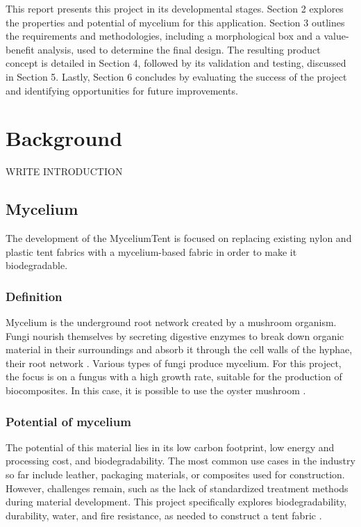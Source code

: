 \documentclass{article}
\begin{document}
This report presents this project in its developmental stages. Section 2 explores the
properties and potential of mycelium for this application. Section 3 outlines the
requirements and methodologies, including a morphological box and a value-benefit
analysis, used to determine the final design. The resulting product concept is detailed in
Section 4, followed by its validation and testing, discussed in Section 5. Lastly,
Section 6 concludes by evaluating the success of the project and identifying opportunities
for future improvements.


\newpage
\section{Background}
WRITE INTRODUCTION

\subsection{Mycelium}
The development of the MyceliumTent is focused on replacing existing nylon and plastic
tent fabrics with a mycelium-based fabric in order to make it biodegradable.

\subsubsection{Definition}
Mycelium is the underground root network created by a mushroom organism. Fungi
nourish themselves by secreting digestive enzymes to break down organic material in
their surroundings and absorb it through the cell walls of the hyphae, their root network
\parencite{fungus}. Various types of fungi produce mycelium. For this project, the focus
is on a fungus with a high growth rate, suitable for the production of biocomposites. In
this case, it is possible to use the oyster mushroom \parencite{mushroom}.

\subsubsection{Potential of mycelium}
The potential of this material lies in its low carbon footprint, low energy and processing
cost, and biodegradability. The most common use
cases in the industry so far include leather, packaging materials, or composites used for
construction. However, challenges remain, such as the lack of standardized treatment
methods during material development. This project specifically explores
biodegradability, durability, water, and fire resistance, as needed to construct a tent
fabric \parencite{ALANEME2023234}.
\end{document}
